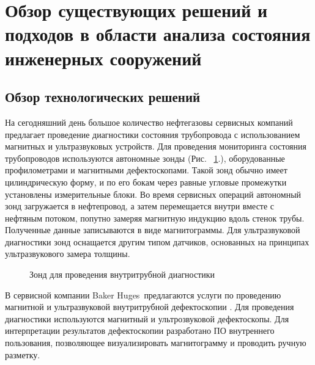 \documentclass[a4paper,article,14pt]{extarticle}
\begin{document}
\pagebreak
\section{Обзор существующих решений и подходов в области анализа состояния инженерных сооружений}

\subsection{Обзор технологических решений}

На сегодняшний день большое количество нефтегазовы сервисных компаний предлагает проведение диагностики состояния 
трубопровода с использованием магнитных и ультразвуковых устройств. Для проведения мониторинга состояния трубопроводов 
используются автономные зонды (Рис. ~\ref{image1}.), оборудованные профилометрами и магнитными дефектоскопами. Такой зонд обычно имеет 
цилиндрическую форму, и по его бокам через равные угловые промежутки установлены измерительные блоки. Во время сервисных 
операций автономный зонд загружается в нефтепровод, а затем перемещается внутри вместе с нефтяным потоком, попутно замеряя 
магнитную индукцию вдоль стенок трубы. Полученные данные записываются в виде магнитограммы. Для ультразвуковой диагностики зонд 
оснащается другим типом датчиков, основанных на принципах ультразвукового замера толщины.

\begin{figure}[ht]
    \begin{center}
    
    \caption{
    \label{image1}
    Зонд для проведения внутритрубной диагностики}
    \end {center}
\end {figure}

В сервисной компании \flqq Baker Huges\frqq\, предлагаются услуги по проведению магнитной и ультразвуковой внутритрубной дефектоскопии \cite{s2}.
Для проведения диагностики используются магнитный и ультрозвуковой дефектоскопы. Для интерпретации результатов дефектоскопии 
разработано ПО внутреннего пользования, позволяющее визуализировать магнитограмму и проводить ручную разметку.
\end{document}
